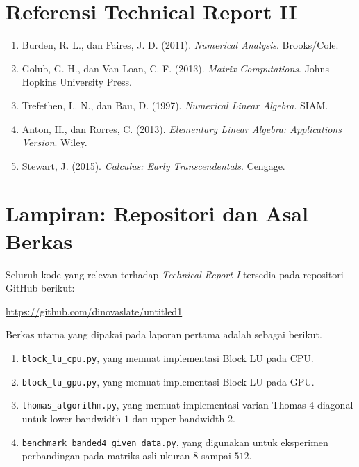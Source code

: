 \documentclass[12pt,a4paper]{article}
\begin{document}
\section*{Referensi Technical Report II}
\begin{enumerate}[leftmargin=1.25em]
  \item Burden, R. L., dan Faires, J. D. (2011). \emph{Numerical Analysis}. Brooks/Cole.
  \item Golub, G. H., dan Van Loan, C. F. (2013). \emph{Matrix Computations}. Johns Hopkins University Press.
  \item Trefethen, L. N., dan Bau, D. (1997). \emph{Numerical Linear Algebra}. SIAM.
  \item Anton, H., dan Rorres, C. (2013). \emph{Elementary Linear Algebra: Applications Version}. Wiley.
  \item Stewart, J. (2015). \emph{Calculus: Early Transcendentals}. Cengage.
\end{enumerate}

\section*{Lampiran: Repositori dan Asal Berkas}
Seluruh kode yang relevan terhadap \emph{Technical Report I} tersedia pada repositori GitHub berikut:
\begin{center}
\url{https://github.com/dinovaslate/untitled1}
\end{center}

Berkas utama yang dipakai pada laporan pertama adalah sebagai berikut.
\begin{enumerate}[leftmargin=1.5em]
  \item \texttt{block\_lu\_cpu.py}, yang memuat implementasi Block LU pada CPU.
  \item \texttt{block\_lu\_gpu.py}, yang memuat implementasi Block LU pada GPU.
  \item \texttt{thomas\_algorithm.py}, yang memuat implementasi varian Thomas 4-diagonal untuk lower bandwidth $1$ dan upper bandwidth $2$.
  \item \texttt{benchmark\_banded4\_given\_data.py}, yang digunakan untuk eksperimen perbandingan pada matriks asli ukuran $8$ sampai $512$.
\end{enumerate}
\end{document}
